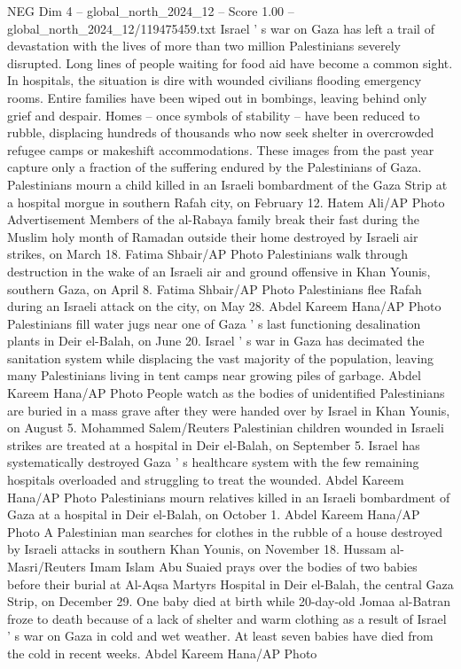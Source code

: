 \begin{textsample}{NEG Dim 4 – global\_north\_2024\_12 – Score 1.00 – global\_north\_2024\_12/119475459.txt}  \label{ex:f4_neg_153}
Israel ' s war on Gaza has left a trail of devastation with the lives of more than two million Palestinians severely disrupted.
Long lines of people waiting for food aid have become a common sight.
In hospitals, the situation is dire with wounded civilians flooding emergency rooms.
Entire families have been wiped out in bombings, leaving behind only grief and despair.
Homes -- once symbols of stability -- have been reduced to rubble, displacing hundreds of thousands who now seek shelter in overcrowded refugee camps or makeshift accommodations.
These images from the past year capture only a fraction of the suffering endured by the Palestinians of Gaza.
Palestinians mourn a child killed in an Israeli bombardment of the Gaza Strip at a hospital morgue in southern Rafah city, on February 12.
Hatem Ali/AP Photo Advertisement Members of the al-Rabaya family break their fast during the Muslim holy month of Ramadan outside their home destroyed by Israeli air strikes, on March 18.
Fatima Shbair/AP Photo Palestinians walk through destruction in the wake of an Israeli air and ground offensive in Khan Younis, southern Gaza, on April 8.
Fatima Shbair/AP Photo Palestinians flee Rafah during an Israeli attack on the city, on May 28.
Abdel Kareem Hana/AP Photo Palestinians fill water jugs near one of Gaza ' s last functioning desalination plants in Deir el-Balah, on June 20.
Israel ' s war in Gaza has decimated the sanitation system while displacing the vast majority of the population, leaving many Palestinians living in tent camps near growing piles of garbage.
Abdel Kareem Hana/AP Photo People watch as the bodies of unidentified Palestinians are buried in a mass grave after they were handed over by Israel in Khan Younis, on August 5.
Mohammed Salem/Reuters Palestinian children wounded in Israeli strikes are treated at a hospital in Deir el-Balah, on September 5.
Israel has systematically destroyed Gaza ' s healthcare system with the few remaining hospitals overloaded and struggling to treat the wounded.
Abdel Kareem Hana/AP Photo Palestinians mourn relatives killed in an Israeli bombardment of Gaza at a hospital in Deir el-Balah, on October 1.
Abdel Kareem Hana/AP Photo A Palestinian man searches for clothes in the rubble of a house destroyed by Israeli attacks in southern Khan Younis, on November 18.
Hussam al-Masri/Reuters Imam Islam Abu Suaied prays over the bodies of two babies before their burial at Al-Aqsa Martyrs Hospital in Deir el-Balah, the central Gaza Strip, on December 29.
One baby died at birth while 20-day-old Jomaa al-Batran froze to death because of a lack of shelter and warm clothing as a result of Israel ' s war on Gaza in cold and wet weather.
At least seven babies have died from the cold in recent weeks.
Abdel Kareem Hana/AP Photo

\end{textsample}
